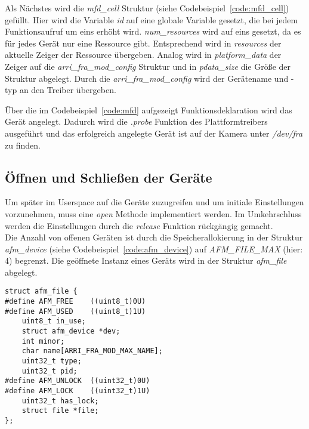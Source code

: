 Als Nächstes wird die \textit{mfd\_cell} Struktur (siehe Codebeispiel~\ref{code:mfd_cell}) gefüllt. Hier wird die Variable \textit{id} auf eine globale Variable gesetzt, die bei jedem Funktionsaufruf um eins erhöht wird. \textit{num\_resources} wird auf eins gesetzt, da es für jedes Gerät nur eine Ressource gibt. Entsprechend wird in  \textit{resources} der aktuelle Zeiger der Ressource übergeben. Analog wird in \textit{platform\_data} der Zeiger auf die \textit{arri\_fra\_mod\_config} Struktur und in \textit{pdata\_size} die Größe der Struktur abgelegt.
Durch die \textit{arri\_fra\_mod\_config} wird der Gerätename und -typ an den Treiber übergeben.


Über die im Codebeispiel~\ref{code:mfd} aufgezeigt Funktionsdeklaration wird das Gerät angelegt. Dadurch wird die \textit{.probe} Funktion des Plattformtreibers ausgeführt und das erfolgreich angelegte Gerät ist auf der Kamera unter \textit{/dev/fra} zu finden.


\subsection{Öffnen und Schließen der Geräte}
Um später im Userspace auf die Geräte zuzugreifen und um initiale Einstellungen vorzunehmen, muss eine \textit{open} Methode implementiert werden. Im Umkehrschluss werden die Einstellungen durch die \textit{release} Funktion rückgängig gemacht. \cite[Seite 58f.]{corbet2005linux} \\

Die Anzahl von offenen Geräten ist durch die Speicherallokierung in der Struktur \textit{afm\_device} (siehe Codebeispiel~\ref{code:afm_device}) auf \textit{AFM\_FILE\_MAX} (hier: 4) begrenzt. Die geöffnete Instanz eines Geräts wird in der Struktur \textit{afm\_file} abgelegt.

\begin{lstlisting}
struct afm_file {  
#define AFM_FREE    ((uint8_t)0U)
#define AFM_USED    ((uint8_t)1U)
	uint8_t in_use;
	struct afm_device *dev;
	int minor;
	char name[ARRI_FRA_MOD_MAX_NAME];
	uint32_t type;
	uint32_t pid;
#define AFM_UNLOCK  ((uint32_t)0U)
#define AFM_LOCK    ((uint32_t)1U)
	uint32_t has_lock;
	struct file *file;
};
\end{lstlisting}

